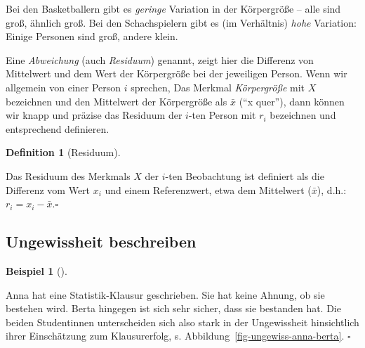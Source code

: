 \documentclass[
  letterpaper,
  oneside,
  open=any]{scrbook}
\theoremstyle{definition}
\theoremstyle{definition}
\newtheorem{example}{Beispiel}[chapter]
\theoremstyle{definition}
\newtheorem{definition}{Definition}[chapter]
\theoremstyle{remark}
\begin{document}
Bei den Basketballern gibt es \emph{geringe} Variation in der
Körpergröße -- alle sind groß, ähnlich groß. Bei den Schachspielern gibt
es (im Verhältnis) \emph{hohe} Variation: Einige Personen sind groß,
andere klein.

Eine \emph{Abweichung} (auch \emph{Residuum}) genannt, zeigt hier die
Differenz von Mittelwert und dem Wert der Körpergröße bei der jeweiligen
Person. Wenn wir allgemein von einer Person \(i\) sprechen, Das Merkmal
\emph{Körpergröße} mit \(X\) bezeichnen und den Mittelwert der
Körpergröße als \(\bar{x}\) (\enquote{x quer}), dann können wir knapp
und präzise das Residuum der \(i\)-ten Person mit \(r_i\) bezeichnen und
entsprechend definieren.

\begin{definition}[Residuum]\protect\hypertarget{def-residuum}{}\label{def-residuum}

Das Residuum des Merkmals \(X\) der \(i\)-ten Beobachtung ist definiert
als die Differenz vom Wert \(x_i\) und einem Referenzwert, etwa dem
Mittelwert (\(\bar{x}\)), d.h.: \(r_i = x_i - \bar{x}.\square\)

\end{definition}

\subsection{Ungewissheit beschreiben}\label{ungewissheit-beschreiben}

\begin{example}[]\protect\hypertarget{exm-ungewiss1}{}\label{exm-ungewiss1}

Anna hat eine Statistik-Klausur geschrieben. Sie hat keine Ahnung, ob
sie bestehen wird. Berta hingegen ist sich sehr sicher, dass sie
bestanden hat. Die beiden Studentinnen unterscheiden sich also stark in
der Ungewissheit hinsichtlich ihrer Einschätzung zum Klausurerfolg, s.
Abbildung~\ref{fig-ungewiss-anna-berta}. \(\square\)

\end{example}
\end{document}
